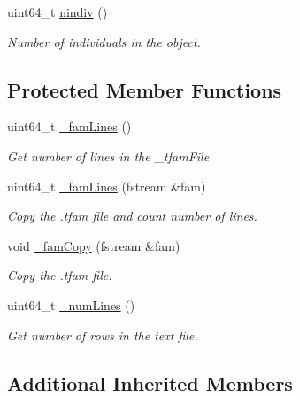 \begin{DoxyCompactItemize}
\mbox{\label{classsamp_files_1_1_tped_file_i_a57f688e39a252282343c90589255f135}} 
uint64\+\_\+t \hyperlink{classsamp_files_1_1_tped_file_i_a57f688e39a252282343c90589255f135}{nindiv} ()
\begin{DoxyCompactList}\small\item\em Number of individuals in the object. \end{DoxyCompactList}\end{DoxyCompactItemize}
\subsection*{Protected Member Functions}
\begin{DoxyCompactItemize}
\item 
uint64\+\_\+t \hyperlink{classsamp_files_1_1_tped_file_i_a4843f5182b5323d7f67b7807038ee5ca}{\+\_\+fam\+Lines} ()
\begin{DoxyCompactList}\small\item\em Get number of lines in the {\ttfamily \+\_\+tfam\+File} \end{DoxyCompactList}\item 
uint64\+\_\+t \hyperlink{classsamp_files_1_1_tped_file_i_a0de1ee15a0f1a11e5fa87bba3c05aab4}{\+\_\+fam\+Lines} (fstream \&fam)
\begin{DoxyCompactList}\small\item\em Copy the .tfam file and count number of lines. \end{DoxyCompactList}\item 
void \hyperlink{classsamp_files_1_1_tped_file_i_af8b3f03ea942cd5bed77a45c9ebf46e3}{\+\_\+fam\+Copy} (fstream \&fam)
\begin{DoxyCompactList}\small\item\em Copy the .tfam file. \end{DoxyCompactList}\item 
uint64\+\_\+t \hyperlink{classsamp_files_1_1_tped_file_i_a83b4ec62cab76ae022be282b0ec357a6}{\+\_\+num\+Lines} ()
\begin{DoxyCompactList}\small\item\em Get number of rows in the text file. \end{DoxyCompactList}\end{DoxyCompactItemize}
\subsection*{Additional Inherited Members}


